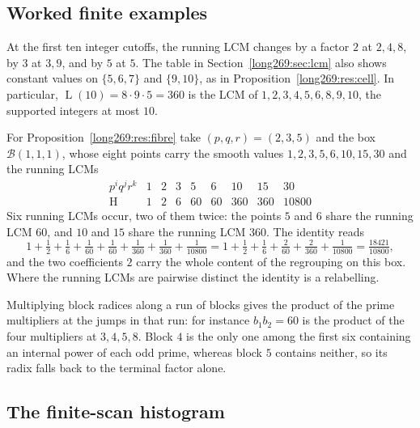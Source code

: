 \documentclass[11pt]{article}
\theoremstyle{remark}
\theoremstyle{plain}
\newcommand{\hgt}{\operatorname{H}}
\newcommand{\Lprefix}{\operatorname{L}}
\begin{document}
\subsection{Worked finite examples}\label{long269:long:finite-geometry}

At the first ten integer cutoffs, the running LCM changes by a factor $2$
at $2,4,8$, by $3$ at $3,9$, and by $5$ at $5$.
The table in Section~\ref{long269:sec:lcm} also shows constant values on
$\{5,6,7\}$ and $\{9,10\}$, as in
Proposition~\ref{long269:res:cell}. In particular,
$\Lprefix(10)=8\cdot9\cdot5=360$ is the LCM of
$1,2,3,4,5,6,8,9,10$, the supported integers at most $10$.

For Proposition~\ref{long269:res:fibre} take $(p,q,r)=(2,3,5)$ and the box
$\mathcal B(1,1,1)$, whose eight points carry the smooth values
$1,2,3,5,6,10,15,30$ and the running LCMs
\[
\begin{array}{c|cccccccc}
p^{i}q^{j}r^{k}&1&2&3&5&6&10&15&30\\ \hline
\hgt&1&2&6&60&60&360&360&10800
\end{array}
\]
Six running LCMs occur, two of them twice: the points $5$ and $6$ share the running LCM
$60$, and $10$ and $15$ share the running LCM $360$.  The identity reads
\[
 1+\tfrac12+\tfrac16+\tfrac1{60}+\tfrac1{60}+\tfrac1{360}+\tfrac1{360}
 +\tfrac1{10800}
 =1+\tfrac12+\tfrac16+\tfrac2{60}+\tfrac2{360}+\tfrac1{10800}
 =\tfrac{18421}{10800},
\]
and the two coefficients $2$ carry the whole content of the regrouping on this
box.  Where the running LCMs are pairwise distinct the identity is a relabelling.

Multiplying block radices along a run of blocks gives the product of the
prime multipliers at the jumps in that run: for instance $b_1b_2=60$ is the product of the
four multipliers at $3,4,5,8$.  Block $4$ is the only one among the first six
containing an internal power of each odd prime, whereas block $5$ contains neither, so
its radix falls back to the terminal factor alone.

\subsection{The finite-scan histogram}\label{long269:long:experiments}
\end{document}
